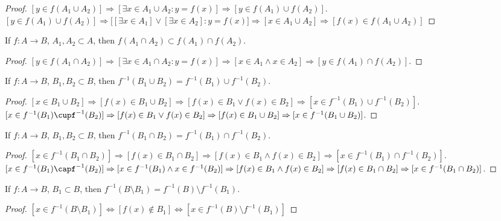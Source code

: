         \begin{proof}
        $[y\in f(A_1\cup A_2)]\Rightarrow [\exists x\in A_1 \cup A_2:y=f(x)]\Rightarrow [y \in f(A_1)\cup f(A_2)]$. $[y\in f(A_1)\cup f(A_2)]\Rightarrow \big[[\exists x\in A_1] \lor[\exists x\in A_2]: y=f(x)\big]\Rightarrow [x\in A_1\cup A_2]\Rightarrow [f(x)\in f(A_1\cup A_2)]$
        \end{proof}
        \begin{theorem}
        If $f:A\rightarrow B$, $A_1,A_2\subset A$, then $f(A_1\cap A_2)\subset f(A_1)\cap f(A_2)$.
        \end{theorem}
        \begin{proof}
        $[y\in f(A_1 \cap A_2)]\Rightarrow [\exists x\in A_1 \cap A_2:y=f(x)]\Rightarrow [x\in A_1 \land x \in A_2] \Rightarrow[y \in f(A_1)\cap f(A_2)]$.
        \end{proof}
        \begin{theorem}
        If $f:A\rightarrow B$, $B_1,B_2\subset B$, then $f^{-1}(B_1\cup B_2) = f^{-1}(B_1)\cup f^{-1}(B_2)$.
        \end{theorem}
        \begin{proof}
        $[x\in B_1\cup B_2]\Rightarrow [f(x)\in B_1\cup B_2]\Rightarrow [f(x)\in B_1\lor f(x)\in B_2]\Rightarrow [x\in f^{-1}(B_1)\cup f^{-1}(B_2)]$. $[x \in f^{-1}(B_1)\cupf^{-1}(B_2)]\Rightarrow [f(x)\in B_1\lor f(x) \in B_2]\Rightarrow [f(x) \in B_1\cup B_2]\Rightarrow [x\in f^{-1}(B_1\cup B_2)]$.
        \end{proof}
        \begin{theorem}
        If $f:A\rightarrow B$, $B_1,B_2\subset B$, then $f^{-1}(B_1\cap B_2) = f^{-1}(B_1)\cap f^{-1}(B_2)$.
        \end{theorem}
        \begin{proof}
        $[x\in f^{-1}(B_1\cap B_2)]\Rightarrow [f(x) \in B_1 \cap B_2]\Rightarrow [f(x)\in B_1\land f(x) \in B_2 ]\Rightarrow [x\in f^{-1}(B_1)\cap f^{-1}(B_2)]$. $[x\in f^{-1}(B_1)\capf^{-1}(B_2)]\Rightarrow [x\in f^{-1}(B_1)\land x\in f^{-1}(B_2)]\Rightarrow [f(x) \in B_1\land f(x) \in B_2]\Rightarrow [f(x)\in B_1\cap B_2]\Rightarrow [x\in f^{-1}(B_1\cap B_2)]$.
        \end{proof}
        \begin{theorem}
        If $f:A\rightarrow B$, $B_1 \subset B$, then $f^{-1}(B\setminus B_1) = f^{-1}(B)\setminus f^{-1}(B_1)$.
        \end{theorem}
        \begin{proof}
        $[x\in f^{-1}(B\setminus B_1)]\Leftrightarrow [f(x)\notin B_1]\Leftrightarrow [x\in f^{-1}(B)\setminus f^{-1}(B_1)]$
        \end{proof}
